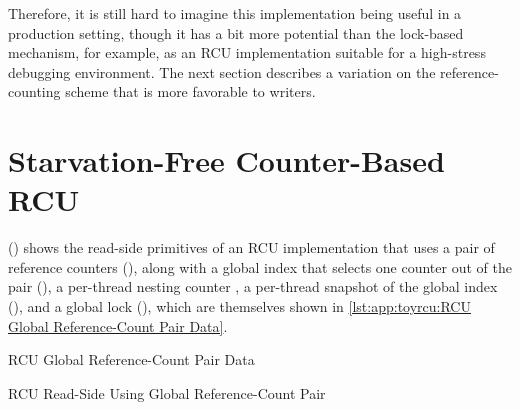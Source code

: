 \QuickQuizEnd

Therefore, it is still hard to imagine this implementation being useful
in a production setting, though it has a bit more potential
than the lock-based mechanism, for example, as an RCU implementation
suitable for a high-stress debugging environment.
The next section describes a variation on the reference-counting
scheme that is more favorable to writers.

\section{Starvation-Free Counter-Based RCU}
\label{sec:app:toyrcu:Starvation-Free Counter-Based RCU}

()
shows the read-side primitives of an RCU implementation that uses a pair
of reference counters (),
along with a global index that
selects one counter out of the pair (),
a per-thread nesting counter ,
a per-thread snapshot of the global index (),
and a global lock (),
which are themselves shown in
\cref{lst:app:toyrcu:RCU Global Reference-Count Pair Data}.

\begin{listing}

\caption{RCU Global Reference-Count Pair Data}
\label{lst:app:toyrcu:RCU Global Reference-Count Pair Data}
\end{listing}

\begin{listing}

\caption{RCU Read-Side Using Global Reference-Count Pair}
\label{lst:app:toyrcu:RCU Read-Side Using Global Reference-Count Pair}
\end{listing}


